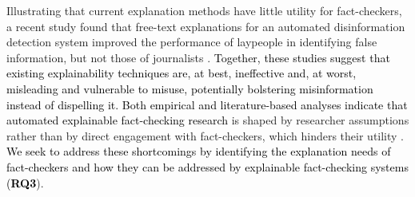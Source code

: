 Illustrating that current explanation methods have little utility for fact-checkers, a recent study found that free-text explanations for an automated disinformation detection system improved the performance of laypeople in identifying false information, but not those of journalists \cite{schmitt2024explhuman}.
\textcolor{black}{Together, these studies suggest that existing explainability techniques are, at best, ineffective and, at worst, misleading and vulnerable to misuse, potentially bolstering misinformation instead of dispelling it.
Both empirical \cite{schmitt2024explhuman} and literature-based \cite{schlichtkrull2023usesfactchecking} analyses indicate that automated explainable fact-checking research} is shaped by researcher assumptions rather than by direct engagement with fact-checkers, which hinders their utility \cite{kotonya2020explainablesurvey,Das2023state}.
\textcolor{black}{We seek to address these shortcomings by identifying the explanation needs of fact-checkers and how they can be addressed by explainable fact-checking systems (\textbf{RQ3}}).


